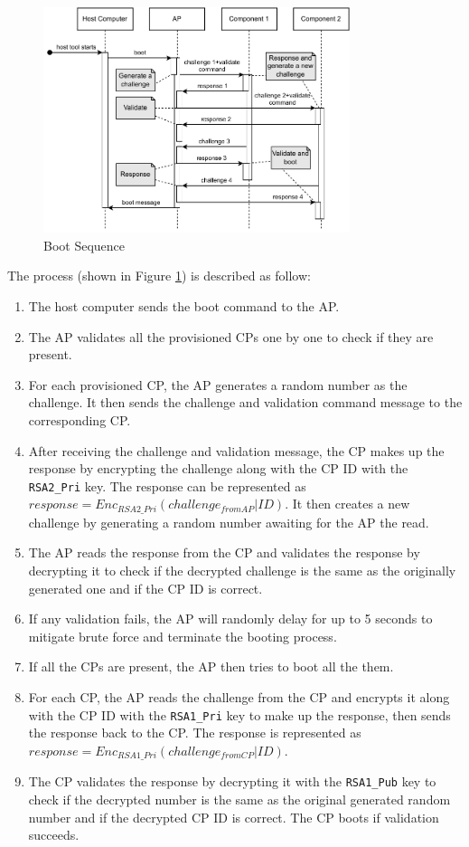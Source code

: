 \documentclass[11pt,oneside,onecolumn,letterpaper]{article}
\begin{document}
	\begin{figure}[h]
		\centering
		\includegraphics[width=0.8\textwidth]{pics/boot.pdf}
		\caption{Boot Sequence}
		\label{fig:functionality_boot}
	\end{figure}
	
	The process (shown in Figure \ref{fig:functionality_boot}) is described as follow:
	\begin{enumerate}
		\item The host computer sends the boot command to the AP.
		\item The AP validates all the provisioned CPs one by one to check if they are present.
		\item For each provisioned CP,
		the AP generates a random number as the challenge.
		It then sends the challenge and validation command message to the corresponding CP.
		\item After receiving the challenge and validation message,
		the CP makes up the response by encrypting the challenge along with the CP ID with the \texttt{RSA2\_Pri} key.
		The response can be represented as $ response = Enc_{RSA2\_Pri} (challenge_{from AP} | ID) $.
		It then creates a new challenge by generating a random number awaiting for the AP the read.
		\item The AP reads the response from the CP and validates the response by decrypting it to check if the decrypted challenge is the same as the originally generated one and if the CP ID is correct.
		\item If any validation fails,
		the AP will randomly delay for up to 5 seconds to mitigate brute force and terminate the booting process.
		\item If all the CPs are present,
		the AP then tries to boot all the them.
		\item For each CP,
		the AP reads the challenge from the CP and encrypts it along with the CP ID with the \texttt{RSA1\_Pri} key to make up the response,
		then sends the response back to the CP.
		The response is represented as $ response = Enc_{RSA1\_Pri} (challenge_{from CP} | ID) $.
		\item The CP validates the response by decrypting it with the \texttt{RSA1\_Pub} key to check if the decrypted number is the same as the original generated random number and if the decrypted CP ID is correct.
		The CP boots if validation succeeds.
	\end{enumerate}
	
\end{document}
